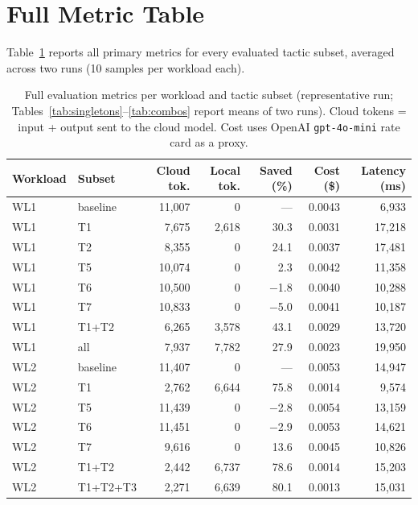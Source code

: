 \documentclass[11pt,a4paper]{article}
\begin{document}
\appendix

\section{Full Metric Table}
\label{app:full}

Table~\ref{tab:full} reports all primary metrics for every evaluated
tactic subset, averaged across two runs (10 samples per workload each).

\begin{table}[h]
\centering
\small
\caption{Full evaluation metrics per workload and tactic subset
  (representative run; Tables~\ref{tab:singletons}--\ref{tab:combos}
  report means of two runs).
  Cloud tokens = input + output sent to the cloud model.
  Cost uses OpenAI \texttt{gpt-4o-mini} rate card as a proxy.}
\label{tab:full}
\begin{tabular}{l l r r r r r}
\toprule
Workload & Subset & Cloud tok. & Local tok. & Saved (\%) & Cost (\$) & Latency (ms) \\
\midrule
WL1 & baseline  & 11{,}007 &     0 &   --- & 0.0043 &  6{,}933 \\
WL1 & T1        &  7{,}675 & 2{,}618 & 30.3 & 0.0031 & 17{,}218 \\
WL1 & T2        &  8{,}355 &     0 & 24.1 & 0.0037 & 17{,}481 \\
WL1 & T5        & 10{,}074 &     0 &  2.3 & 0.0042 & 11{,}358 \\
WL1 & T6        & 10{,}500 &     0 & $-$1.8 & 0.0040 & 10{,}288 \\
WL1 & T7        & 10{,}833 &     0 & $-$5.0 & 0.0041 & 10{,}187 \\
WL1 & T1+T2     &  6{,}265 & 3{,}578 & 43.1 & 0.0029 & 13{,}720 \\
WL1 & all       &  7{,}937 & 7{,}782 & 27.9 & 0.0023 & 19{,}950 \\
\midrule
WL2 & baseline  & 11{,}407 &     0 &   --- & 0.0053 & 14{,}947 \\
WL2 & T1        &  2{,}762 & 6{,}644 & 75.8 & 0.0014 &  9{,}574 \\
WL2 & T5        & 11{,}439 &     0 & $-$2.8 & 0.0054 & 13{,}159 \\
WL2 & T6        & 11{,}451 &     0 & $-$2.9 & 0.0053 & 14{,}621 \\
WL2 & T7        &  9{,}616 &     0 & 13.6 & 0.0045 & 10{,}826 \\
WL2 & T1+T2     &  2{,}442 & 6{,}737 & 78.6 & 0.0014 & 15{,}203 \\
WL2 & T1+T2+T3  &  2{,}271 & 6{,}639 & 80.1 & 0.0013 & 15{,}031 \\

\end{tabular}
\end{table}
\end{document}
